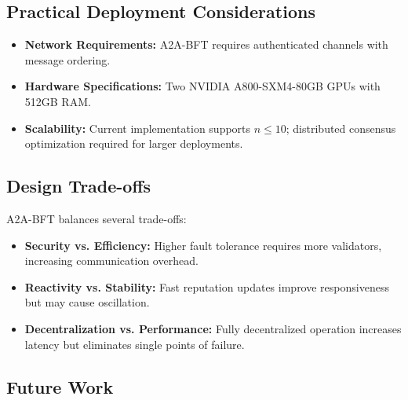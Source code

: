 \documentclass{article}
\begin{document}
\subsection{Practical Deployment Considerations}\label{app:deployment}

\begin{itemize}
    \item \textbf{Network Requirements:} A2A-BFT requires authenticated channels with message ordering.
    \item \textbf{Hardware Specifications:} Two NVIDIA A800-SXM4-80GB GPUs with 512GB RAM.
    \item \textbf{Scalability:} Current implementation supports $n \leq 10$; distributed consensus optimization required for larger deployments.
\end{itemize}

\subsection{Design Trade-offs}

A2A-BFT balances several trade-offs:
\begin{itemize}
    \item \textbf{Security vs. Efficiency:} Higher fault tolerance requires more validators, increasing communication overhead.
    \item \textbf{Reactivity vs. Stability:} Fast reputation updates improve responsiveness but may cause oscillation.
    \item \textbf{Decentralization vs. Performance:} Fully decentralized operation increases latency but eliminates single points of failure.
\end{itemize}

\subsection{Future Work}
\end{document}
